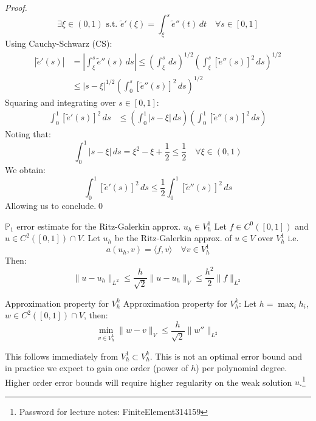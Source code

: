 \begin{proof}
    \[
        \exists \xi \in (0, 1) \text{ s.t. } \tilde{e}'(\xi) = \int_{\xi}^s \tilde{e}''(t) \, dt \quad \forall s \in [0, 1]
    \]
    Using Cauchy-Schwarz (CS):
    \begin{align*}
        |\tilde{e}'(s)| & = \left|\int_{\xi}^s \tilde{e}''(s) \, ds\right| \leq \left(\int_{\xi}^s \, ds\right)^{1/2} \left(\int_{\xi}^s \left[\tilde{e}''(s)\right]^2 \, ds\right)^{1/2} \\
                        & \leq \left|s - \xi\right|^{1/2} \left(\int_0^s \left[\tilde{e}''(s)\right]^2 \, ds\right)^{1/2}
    \end{align*}
    Squaring and integrating over $s \in [0, 1]$:
    \begin{align*}
        \int_0^1 \left[\tilde{e}'(s)\right]^2 \, ds & \leq \left(\int_0^1 |s - \xi| \, ds\right) \left(\int_0^1 \left[\tilde{e}''(s)\right]^2 \, ds\right)
    \end{align*}
    Noting that:
    \[
        \int_0^1 |s - \xi| \, ds = \xi^2 - \xi + \frac{1}{2} \leq \frac{1}{2} \quad \forall \xi \in (0, 1)
    \]
    We obtain:
    \[
        \int_0^1 \left[\tilde{e}'(s)\right]^2 \, ds \leq \frac{1}{2} \int_0^1 \left[\tilde{e}''(s)\right]^2 \, ds
    \]
    Allowing us to conclude.\qed
\end{proof}

\begin{corollary}{$\mathbb{P}_1$ error estimate for the Ritz-Galerkin approx. $u_h \in V_h^1$}{}
    Let $f \in C^0([0, 1])$ and $u \in C^2([0, 1]) \cap V$. Let $u_h$ be the Ritz-Galerkin approx. of $u \in V$ over $V_h^1$ i.e.
    \[
        a(u_h, v) = \langle f, v \rangle \quad \forall v \in V_h^1
    \]
    Then:
    \[
        \|u - u_h\|_{L^2} \leq \frac{h}{\sqrt{2}} \|u - u_h\|_V \leq \frac{h^2}{2} \|f\|_{L^2}
    \]
\end{corollary}

\begin{corollary}{Approximation property for $V_h^k$}{}
    Approximation property for $V_h^k$: Let $h = \max_i h_i$, $w \in C^2([0, 1]) \cap V$, then:
    \[
        \min_{v \in V_h^k} \|w - v\|_V \leq \frac{h}{\sqrt{2}} \|w''\|_{L^2}
    \]
\end{corollary}
This follows immediately from $V_h^1 \subset V_h^k$. This is not an optimal error bound and in practice we expect to gain one order (power of $h$) per polynomial degree. Higher order error bounds will require higher regularity on the weak solution $u$.\footnote{Password for lecture notes: FiniteElement314159}

